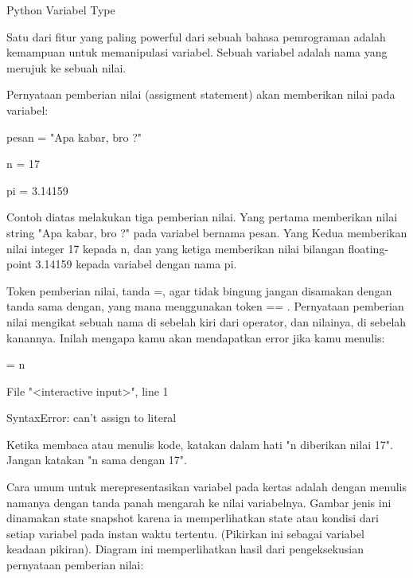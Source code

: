 
\sloppy
Python Variabel Type  \par
\noindent 
Satu dari fitur yang paling powerful dari sebuah bahasa pemrograman adalah kemampuan untuk memanipulasi $  $variabel. Sebuah variabel adalah nama yang merujuk ke sebuah nilai. \par
\vspace{12pt}
\noindent 
Pernyataan pemberian nilai $  $(assigment statement) akan memberikan nilai pada variabel: \par
\vspace{12pt}
\noindent 
pesan = "Apa kabar, bro ?" \par
\noindent 
n = 17 \par
\noindent 
pi = 3.14159 \par
\vspace{12pt}
\noindent 
Contoh diatas melakukan tiga pemberian nilai. Yang pertama memberikan nilai string $  $"Apa kabar, bro ?" $  $pada variabel bernama $  $pesan. Yang Kedua memberikan nilai integer $  $17 $  $kepada $  $n, dan yang ketiga memberikan nilai bilangan floating-point $  $3.14159 $  $kepada variabel dengan nama $  $pi. \par
\vspace{12pt}
\noindent 
Token pemberian nilai, tanda $  $=, agar tidak bingung jangan disamakan dengan tanda $  $sama dengan, yang mana menggunakan token $  $== $  $. Pernyataan pemberian nilai mengikat sebuah $  $nama $  $di sebelah kiri dari operator, dan nilainya, di sebelah kanannya. Inilah mengapa kamu akan mendapatkan error jika kamu menulis: \par
\vspace{12pt}
 = n \par
\noindent 
File "<interactive input>", line 1 \par
\noindent 
SyntaxError: can't assign to literal \par
\vspace{12pt}
\noindent 
Ketika membaca atau menulis kode, katakan dalam hati "n diberikan nilai 17". Jangan katakan "n sama dengan 17". \par
\vspace{12pt}
\noindent 
Cara umum untuk merepresentasikan variabel pada kertas adalah dengan menulis namanya dengan tanda panah mengarah ke nilai variabelnya. Gambar jenis ini dinamakan $  $state snapshot $  $karena ia memperlihatkan state atau kondisi dari setiap variabel pada instan waktu tertentu. (Pikirkan ini sebagai variabel keadaan pikiran). Diagram ini memperlihatkan hasil dari pengeksekusian pernyataan pemberian nilai: \par

